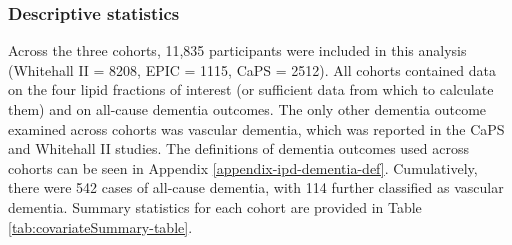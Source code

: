 \documentclass[a4paper, twoside]{templates/ociamthesis}
\begin{document}
\hypertarget{descriptive-statistics}{%
\subsubsection{Descriptive statistics}\label{descriptive-statistics}}

Across the three cohorts, 11,835 participants were included in this analysis (Whitehall II = 8208, EPIC = 1115, CaPS = 2512). All cohorts contained data on the four lipid fractions of interest (or sufficient data from which to calculate them) and on all-cause dementia outcomes. The only other dementia outcome examined across cohorts was vascular dementia, which was reported in the CaPS and Whitehall II studies. The definitions of dementia outcomes used across cohorts can be seen in Appendix \ref{appendix-ipd-dementia-def}. Cumulatively, there were 542 cases of all-cause dementia, with 114 further classified as vascular dementia. Summary statistics for each cohort are provided in Table \ref{tab:covariateSummary-table}.

~
\end{document}
